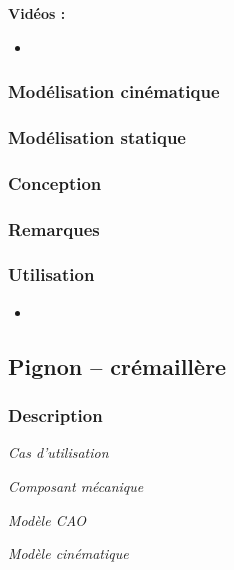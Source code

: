 \documentclass[11pt,oneside]{article}
\begin{document}
\textbf{Vidéos :}
\begin{itemize}
\item
\end{itemize}

\subsubsection{Modélisation cinématique}
\subsubsection{Modélisation statique}
\subsubsection{Conception}
\subsubsection{Remarques}
\subsubsection{Utilisation}
\begin{itemize}
\item
\end{itemize}
\newpage

\subsection{Pignon -- crémaillère}
\subsubsection{Description}

\begin{center}
\hfill
\begin{minipage}[c]{.21\linewidth}
\begin{center}
\textit{Cas d'utilisation}
\end{center}
\end{minipage} \hfill
\begin{minipage}[c]{.21\linewidth}
\begin{center}
\textit{Composant mécanique}
\end{center}
\end{minipage} \hfill
\begin{minipage}[c]{.21\linewidth}
\begin{center}
\textit{Modèle CAO}
\end{center} 
\end{minipage}\hfill
\begin{minipage}[c]{.21\linewidth}
\begin{center}
\textit{Modèle cinématique}
\end{center} 
\end{minipage}\hfill
\end{center}
\end{document}
